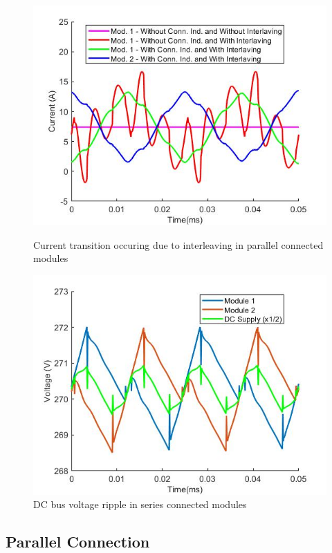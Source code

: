 \begin{figure}[tb]
  \includegraphics[width=\linewidth]{figures/parallel_current_trans.jpg}
  \caption{Current transition occuring due to interleaving in parallel connected modules}\label{fig:parallel_current_trans}
\endminipage\hfill
{}
  \includegraphics[width=\linewidth]{figures/series_volt_ripple.jpg}
  \caption{DC bus voltage ripple in series connected modules}\label{fig:series_volt_ripple}
\endminipage
\end{figure}

\subsection{Parallel Connection}

